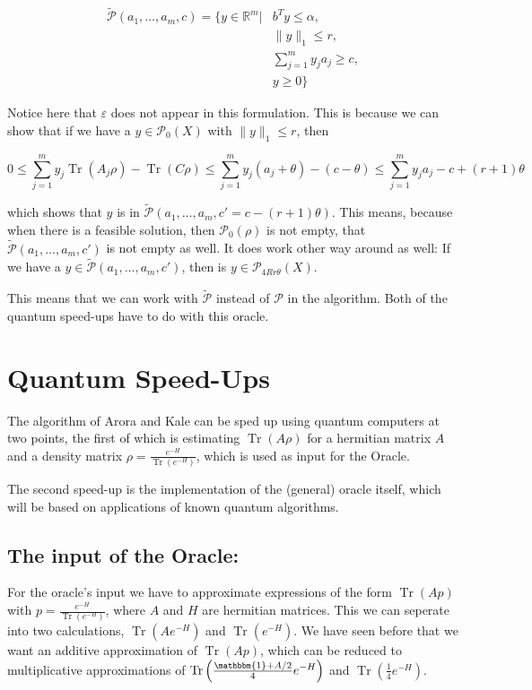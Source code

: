 \documentclass[11pt,a4paper]{scrartcl}
\DeclareMathOperator{\Tr}{Tr}
\newcommand{\R}{\mathbb{R}}
\begin{document}
\begin{align*}
\tilde{\mathcal{P}}(a_1,\ldots, a_m,c)=\{y\in\R^m | &b^Ty\leq\alpha,\\
&\|y\|_1\leq r,\\
 &\sum_{j=1}^m y_j a_j\geq c,\\
 & y\geq 0\}
\end{align*}

Notice here that $\varepsilon$ does not appear in this formulation. This is because we can show that if we have a $y\in\mathcal{P}_0(X)$ with $\|y\|_1\leq r$, then

\begin{equation*}
0\leq \sum_{j=1}^m y_j \Tr(A_j\rho)-\Tr(C\rho) \leq \sum_{j=1}^m y_j (a_j+\theta)-(c-\theta) \leq  \sum_{j=1}^m y_j a_j-c +(r+1)\theta
\end{equation*}

which shows that $y$ is in $\tilde{\mathcal{P}}(a_1,\ldots,a_m, c'=c-(r+1)\theta)$. This means, because when there is a feasible solution, then $\mathcal{P}_0(\rho)$ is not empty, that $\tilde{\mathcal{P}}(a_1,\ldots,a_m, c')$ is not empty as well. It does work other way around as well: If we have a $y\in\tilde{\mathcal{P}}(a_1,\ldots,a_m, c')$, then is $y\in \mathcal{P}_{4Rr\theta}(X)$.

This means that we can work with $\tilde{\mathcal{P}}$ instead of $\mathcal{P}$ in the algorithm. Both of the quantum speed-ups have to do with this oracle.

\section{Quantum Speed-Ups}

The algorithm of Arora and Kale can be sped up using quantum computers at two points, the first of which is estimating $\Tr(A\rho)$ for a hermitian matrix $A$ and a density matrix $\rho = \frac{e^{-H}}{\Tr(e^{-H})}$, which is used as input for the Oracle.

The second speed-up is the implementation of the (general) oracle itself, which will be based on applications of known quantum algorithms.

\subsection{The input of the Oracle:}

For the oracle's input we have to approximate expressions of the form $\Tr(Ap)$ with $p=\frac{e^{-H}}{\Tr(e^{-H})}$, where $A$ and $H$ are hermitian matrices. This we can seperate into two calculations, $\Tr(Ae^{-H})$ and $\Tr(e^{-H})$.
We have seen before that we want an additive approximation of $\Tr(Ap)$, which can be reduced to multiplicative approximations of $\Tr\left(\frac{\mathbbm{1}+A/2}{4}e^{-H}\right)$ and $\Tr\left(\frac{1}{4}e^{-H}\right)$.
\end{document}
